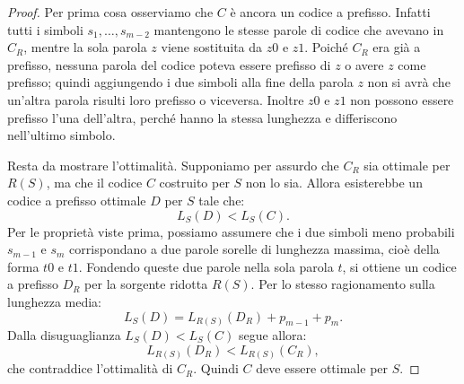 \documentclass{article}
\theoremstyle{definition}
\numberwithin{equation}{section}
\begin{document}
\begin{proof}
    Per prima cosa osserviamo che $C$ è ancora un codice a prefisso. Infatti tutti i simboli $s_1,\ldots,s_{m-2}$ mantengono le stesse parole di codice che avevano in $C_R$, mentre la sola parola $z$ viene sostituita da $z0$ e $z1$. Poiché $C_R$ era già a prefisso, nessuna parola del codice poteva essere prefisso di $z$ o avere $z$ come prefisso; quindi aggiungendo i due simboli alla fine della parola $z$ non si avrà che un'altra parola risulti loro prefisso o viceversa. Inoltre $z0$ e $z1$ non possono essere prefisso l'una dell'altra, perché hanno la stessa lunghezza e differiscono nell'ultimo simbolo.

    Resta da mostrare l'ottimalità. Supponiamo per assurdo che $C_R$ sia ottimale per $R(S)$, ma che il codice $C$ costruito per $S$ non lo sia. Allora esisterebbe un codice a prefisso ottimale $D$ per $S$ tale che:
    \[
        L_S(D)<L_S(C).
    \]
    Per le proprietà viste prima, possiamo assumere che i due simboli meno probabili $s_{m-1}$ e $s_m$ corrispondano a due parole sorelle di lunghezza massima, cioè della forma $t0$ e $t1$. Fondendo queste due parole nella sola parola $t$, si ottiene un codice a prefisso $D_R$ per la sorgente ridotta $R(S)$. Per lo stesso ragionamento sulla lunghezza media:
    \[
        L_S(D)=L_{R(S)}(D_R)+p_{m-1}+p_m.
    \]
    Dalla disuguaglianza $L_S(D)<L_S(C)$ segue allora:
    \[
        L_{R(S)}(D_R)<L_{R(S)}(C_R),
    \]
    che contraddice l'ottimalità di $C_R$. Quindi $C$ deve essere ottimale per $S$.
\end{proof}
\end{document}
